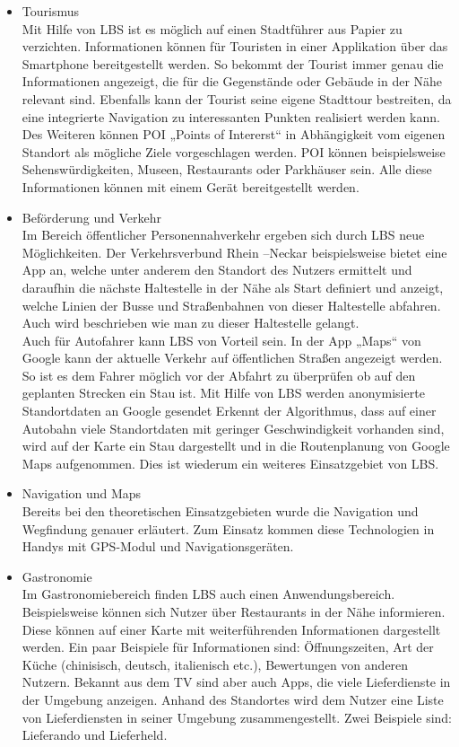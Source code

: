 \begin{itemize}
	\item Tourismus\\
	Mit Hilfe von LBS ist es möglich auf einen Stadtführer aus Papier zu verzichten. Informationen können für Touristen in einer Applikation über das Smartphone bereitgestellt werden. So bekommt der Tourist immer genau die Informationen angezeigt, die für die Gegenstände oder Gebäude in der Nähe relevant sind. Ebenfalls kann der Tourist seine eigene Stadttour bestreiten, da eine integrierte Navigation zu interessanten Punkten realisiert werden kann. Des Weiteren können POI „Points of Intererst“ in Abhängigkeit vom eigenen Standort als mögliche Ziele vorgeschlagen werden. POI können beispielsweise Sehenswürdigkeiten, Museen, Restaurants oder Parkhäuser sein.
Alle diese Informationen können mit einem Gerät bereitgestellt werden.

	\item Beförderung und Verkehr\\
	Im Bereich öffentlicher Personennahverkehr ergeben sich durch LBS neue Möglichkeiten. Der Verkehrsverbund Rhein –Neckar beispielsweise bietet eine App an, welche unter anderem den Standort des Nutzers ermittelt und daraufhin die nächste Haltestelle in der Nähe als Start definiert und anzeigt, welche Linien der Busse und Straßenbahnen von dieser Haltestelle abfahren. Auch wird beschrieben wie man zu dieser Haltestelle gelangt.
\\Auch für Autofahrer kann LBS von Vorteil sein. In der App „Maps“ von Google kann der aktuelle Verkehr auf öffentlichen Straßen angezeigt werden. So ist es dem Fahrer möglich vor der Abfahrt zu überprüfen ob auf den geplanten Strecken ein Stau ist. Mit Hilfe von LBS werden anonymisierte Standortdaten an Google gesendet Erkennt der Algorithmus, dass auf einer Autobahn viele Standortdaten mit geringer Geschwindigkeit vorhanden sind, wird auf der Karte ein Stau dargestellt und in die Routenplanung von Google Maps aufgenommen. Dies ist wiederum ein weiteres Einsatzgebiet von LBS. \cite{StauWarnung}

	
	\item Navigation und Maps\\
	Bereits bei den theoretischen Einsatzgebieten wurde die Navigation und Wegfindung genauer erläutert. Zum Einsatz kommen diese Technologien in Handys mit GPS-Modul und Navigationsgeräten. 
	
	\item Gastronomie\\
	Im Gastronomiebereich finden LBS auch einen Anwendungsbereich. Beispielsweise können sich Nutzer über Restaurants in der Nähe informieren. Diese können auf einer Karte mit weiterführenden Informationen dargestellt werden.  Ein paar Beispiele für Informationen sind: Öffnungszeiten, Art der Küche (chinisisch, deutsch, italienisch etc.), Bewertungen von anderen Nutzern.
Bekannt aus dem TV sind aber auch Apps, die viele Lieferdienste in der Umgebung anzeigen. Anhand des Standortes wird dem Nutzer eine Liste von Lieferdiensten in seiner Umgebung zusammengestellt. Zwei Beispiele sind: Lieferando und Lieferheld.


\end{itemize}
